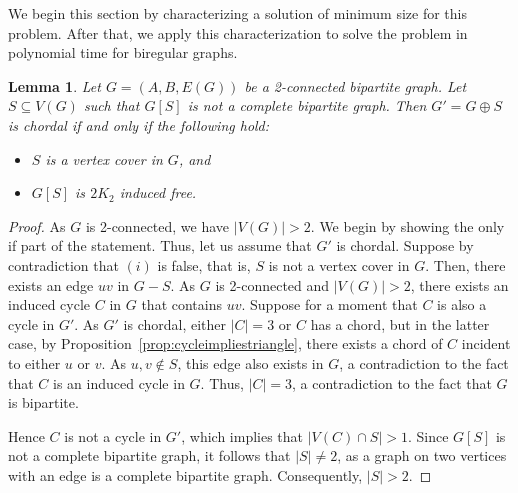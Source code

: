 \documentclass[11pt]{article}
\newtheorem{lemma}[theorem]{Lemma}
\theoremstyle{definition}
\begin{document}
We begin this section by characterizing a solution of minimum size for this problem. After that, we apply this characterization to solve the problem in polynomial time for
biregular graphs.

\begin{lemma}\label{lemma:biparte-charact}
Let $G=(A,B,E(G))$ be a 2-connected bipartite graph.
Let $S \subseteq V(G)$ such that $G[S]$ is not a complete bipartite graph.
Then $G' = G \oplus S$ is chordal if and only if the following hold:
\begin{itemize}
    \item[$(i)$] $S$ is a vertex cover in $G$, and
    \item[$(ii)$] $G[S]$ is $2K_2$ induced free.
\end{itemize}
\end{lemma}
\begin{proof}
As $G$ is 2-connected, we have $|V(G)|>2$.
We begin by showing the only if part of the statement.
Thus, let us assume that $G'$ is chordal.
 Suppose by contradiction that $(i)$ is false, that  is, $S$ is not a vertex cover in $G$. 
Then, there exists an edge $uv$ in $G-S$.
As $G$ is 2-connected and $|V(G)|>2$, there exists an induced cycle $C$ in $G$
that contains $uv$.
Suppose for a moment that $C$ is also a cycle in $G'$.
As $G'$ is chordal, either $|C|=3$ or $C$ has a chord, but in the latter case, by Proposition~\ref{prop:cycleimpliestriangle}, there exists a chord of $C$
incident to either $u$ or $v$.
 As $u,v \notin S$, this edge also exists in $G$, a contradiction to the fact that $C$ is an induced cycle in $G$.
Thus, $|C|=3$, a contradiction to the fact that $G$ is bipartite. 

Hence $C$ is not a cycle in $G'$, which implies that $|V(C)  \cap S| > 1$.
Since $G[S]$ is not a complete bipartite graph, it follows that $|S| \neq 2$,
as a graph on two vertices with an edge is a complete bipartite graph.
Consequently, $|S|>2$.


\end{proof}
\end{document}

